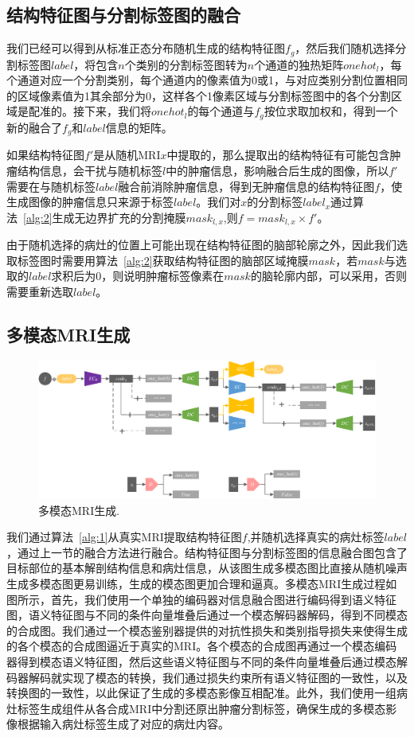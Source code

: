 \documentclass[letterpaper]{article} %
\begin{document}
\subsection{结构特征图与分割标签图的融合}

我们已经可以得到从标准正态分布随机生成的结构特征图$f_g$，然后我们随机选择分割标签图$label$，将包含$n$个类别的分割标签图转为$n$个通道的独热矩阵$onehot_l$，每个通道对应一个分割类别，每个通道内的像素值为0或1，与对应类别分割位置相同的区域像素值为1其余部分为0，这样各个1像素区域与分割标签图中的各个分割区域是配准的。接下来，我们将$onehot_l$的每个通道与$f_g$按位求取加权和，得到一个新的融合了$f_g$和$label$信息的矩阵。

如果结构特征图$f'$是从随机MRI$x$中提取的，那么提取出的结构特征有可能包含肿瘤结构信息，会干扰与随机标签$l$中的肿瘤信息，影响融合后生成的图像，所以$f'$需要在与随机标签$label$融合前消除肿瘤信息，得到无肿瘤信息的结构特征图$f$，使生成图像的肿瘤信息只来源于标签$label$。我们对$x$的分割标签$label_x$通过算法~\ref{alg:2}生成无边界扩充的分割掩膜$mask_{l,x}$,则$f=mask_{l,x}\times f'$。

由于随机选择的病灶的位置上可能出现在结构特征图的脑部轮廓之外，因此我们选取标签图时需要用算法~\ref{alg:2}获取结构特征图的脑部区域掩膜$mask$，若$mask$与选取的$label$求积后为0，则说明肿瘤标签像素在$mask$的脑轮廓内部，可以采用，否则需要重新选取$label$。

\subsection{多模态MRI生成}
\begin{figure}
	\centering
	\includegraphics[width=0.98\linewidth]{figures/mm_mri_generate}
	\caption{多模态MRI生成.}
	\label{mm_mri_generate}
\end{figure}

我们通过算法~\ref{alg:1}从真实MRI提取结构特征图$f$,并随机选择真实的病灶标签$label$，通过上一节的融合方法进行融合。结构特征图与分割标签图的信息融合图包含了目标部位的基本解剖结构信息和病灶信息，从该图生成多模态图比直接从随机噪声生成多模态图更易训练，生成的模态图更加合理和逼真。多模态MRI生成过程如图所示，首先，我们使用一个单独的编码器对信息融合图进行编码得到语义特征图，语义特征图与不同的条件向量堆叠后通过一个模态解码器解码，得到不同模态的合成图。我们通过一个模态鉴别器提供的对抗性损失和类别指导损失来使得生成的各个模态的合成图逼近于真实的MRI。各个模态的合成图再通过一个模态编码器得到模态语义特征图，然后这些语义特征图与不同的条件向量堆叠后通过模态解码器解码就实现了模态的转换，我们通过损失约束所有语义特征图的一致性，以及转换图的一致性，以此保证了生成的多模态影像互相配准。此外，我们使用一组病灶标签生成组件从各合成MRI中分割还原出肿瘤分割标签，确保生成的多模态影像根据输入病灶标签生成了对应的病灶内容。
\end{document}
